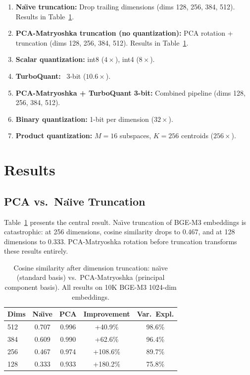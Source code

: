 \documentclass[journal]{IEEEtran}
\begin{document}
\begin{enumerate}
  \item \textbf{Na\"{\i}ve truncation:} Drop trailing dimensions (dims 128, 256, 384, 512).  Results in Table~\ref{tab:pca_vs_naive}.
  \item \textbf{PCA-Matryoshka truncation (no quantization):} PCA rotation + truncation (dims 128, 256, 384, 512).  Results in Table~\ref{tab:pca_vs_naive}.
  \item \textbf{Scalar quantization:} int8 ($4\times$), int4 ($8\times$).
  \item \textbf{TurboQuant:}~\cite{zandieh2026turboquant} 3-bit ($10.6\times$).
  \item \textbf{PCA-Matryoshka + TurboQuant 3-bit:} Combined pipeline (dims 128, 256, 384, 512).
  \item \textbf{Binary quantization:} 1-bit per dimension ($32\times$).
  \item \textbf{Product quantization:} $M = 16$ subspaces, $K = 256$ centroids ($256\times$).
\end{enumerate}


\section{Results}
\label{sec:results}

\subsection{PCA vs.\ Na\"{\i}ve Truncation}
\label{sec:pca_vs_naive}

Table~\ref{tab:pca_vs_naive} presents the central result.
Na\"{\i}ve truncation of BGE-M3 embeddings is catastrophic: at 256 dimensions, cosine similarity drops to 0.467, and at 128 dimensions to 0.333.
PCA-Matryoshka rotation before truncation transforms these results entirely.

\begin{table}[t]
  \centering
  \caption{Cosine similarity after dimension truncation: na\"{\i}ve (standard basis) vs.\ PCA-Matryoshka (principal component basis). All results on 10K BGE-M3 1024-dim embeddings.}
  \label{tab:pca_vs_naive}
  \begin{tabular}{lcccc}
    \toprule
    \textbf{Dims} & \textbf{Na\"{\i}ve} & \textbf{PCA} & \textbf{Improvement} & \textbf{Var.\ Expl.} \\
    \midrule
    512  & 0.707 & 0.996 & +40.9\% & 98.6\% \\
    384  & 0.609 & 0.990 & +62.6\% & 96.4\% \\
    256  & 0.467 & 0.974 & +108.6\% & 89.7\% \\
    128  & 0.333 & 0.933 & +180.2\% & 75.8\% \\
    \bottomrule
  \end{tabular}
\end{table}
\end{document}
